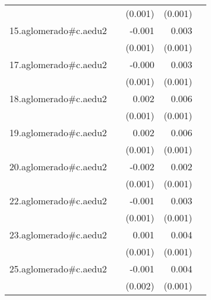 {\begin{longtable}{l*{4}{D{.}{.}{-1}}}
            &                     &     (0.001)         &     (0.001)         &                     \\
\addlinespace
15.aglomerado#c.aedu2&                     &      -0.001         &       0.003\sym{***}&                     \\
            &                     &     (0.001)         &     (0.001)         &                     \\
\addlinespace
17.aglomerado#c.aedu2&                     &      -0.000         &       0.003\sym{***}&                     \\
            &                     &     (0.001)         &     (0.001)         &                     \\
\addlinespace
18.aglomerado#c.aedu2&                     &       0.002         &       0.006\sym{***}&                     \\
            &                     &     (0.001)         &     (0.001)         &                     \\
\addlinespace
19.aglomerado#c.aedu2&                     &       0.002         &       0.006\sym{***}&                     \\
            &                     &     (0.001)         &     (0.001)         &                     \\
\addlinespace
20.aglomerado#c.aedu2&                     &      -0.002         &       0.002         &                     \\
            &                     &     (0.001)         &     (0.001)         &                     \\
\addlinespace
22.aglomerado#c.aedu2&                     &      -0.001         &       0.003\sym{***}&                     \\
            &                     &     (0.001)         &     (0.001)         &                     \\
\addlinespace
23.aglomerado#c.aedu2&                     &       0.001         &       0.004\sym{***}&                     \\
            &                     &     (0.001)         &     (0.001)         &                     \\
\addlinespace
25.aglomerado#c.aedu2&                     &      -0.001         &       0.004\sym{**} &                     \\
            &                     &     (0.002)         &     (0.001)         &                     \\

\end{longtable}}
